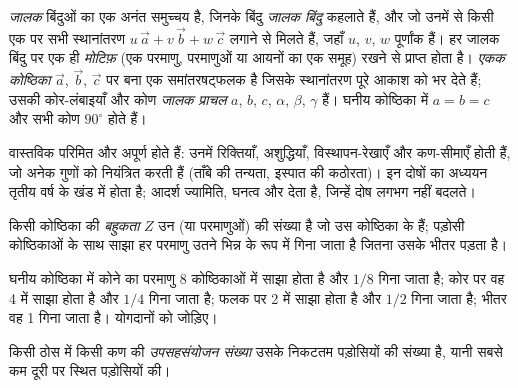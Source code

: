 \begin{definition}[जालक, मोटिफ़, एकक कोष्ठिका]\label{def:b1:crystals-metals:lattice}
\emph{जालक} बिंदुओं का एक अनंत समुच्चय है, जिनके बिंदु
\emph{जालक बिंदु} कहलाते हैं, और जो उनमें से किसी एक पर
सभी स्थानांतरण $u\,\vec a + v\,\vec b + w\,\vec c$ लगाने से मिलते हैं, जहाँ $u$, $v$,
$w$ पूर्णांक हैं। हर जालक बिंदु
पर एक ही \emph{मोटिफ़} (एक परमाणु, परमाणुओं या आयनों का एक समूह)
रखने से  प्राप्त होता है।
\emph{एकक कोष्ठिका} $\vec a$, $\vec b$, $\vec c$ पर बना एक
समांतरषट्फलक है जिसके स्थानांतरण पूरे आकाश को भर देते हैं; उसकी कोर-लंबाइयाँ
और कोण \emph{जालक प्राचल}
$a$, $b$, $c$, $\alpha$, $\beta$, $\gamma$ हैं। घनीय कोष्ठिका में
$a = b = c$ और सभी कोण $90^\circ$ होते हैं।
\end{definition}

\begin{remark}[वास्तविक क्रिस्टल]\label{rem:b1:crystals-metals:real}
वास्तविक  परिमित और अपूर्ण होते हैं: उनमें रिक्तियाँ,
अशुद्धियाँ, विस्थापन-रेखाएँ और कण-सीमाएँ होती हैं, जो अनेक गुणों को नियंत्रित
करती हैं (ताँबे की तन्यता, इस्पात की कठोरता)। इन
दोषों का अध्ययन तृतीय वर्ष के खंड में होता है; आदर्श 
ज्यामिति, घनत्व और  देता है, जिन्हें दोष लगभग नहीं बदलते।
\end{remark}

\begin{definition}[कोष्ठिका की बहुकता]\label{def:b1:crystals-metals:multiplicity}
किसी कोष्ठिका की \emph{बहुकता} $Z$ उन  (या परमाणुओं) की
संख्या है जो उस कोष्ठिका के हैं; पड़ोसी कोष्ठिकाओं के साथ साझा हर परमाणु
उतने भिन्न के रूप में गिना जाता है जितना उसके भीतर पड़ता है।
\end{definition}

\begin{method}[कोष्ठिका के परमाणु गिनना]\label{met:b1:crystals-metals:count}
घनीय कोष्ठिका में कोने का परमाणु 8 कोष्ठिकाओं में साझा होता है और
$1/8$ गिना जाता है; कोर पर वह 4 में साझा होता है और $1/4$ गिना जाता है; फलक पर
2 में साझा होता है और $1/2$ गिना जाता है; भीतर वह 1 गिना जाता है। योगदानों को जोड़िए।
\end{method}

\begin{definition}[उपसहसंयोजन संख्या]\label{def:b1:crystals-metals:coordination}
किसी ठोस में किसी कण की \emph{उपसहसंयोजन संख्या}
उसके निकटतम पड़ोसियों की संख्या है, यानी सबसे कम
दूरी पर स्थित पड़ोसियों की।
\end{definition}

